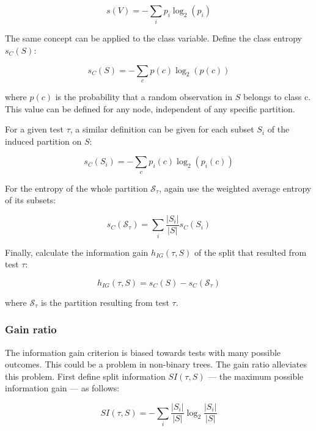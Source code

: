 \begin{equation}
    s(V) = - \sum_i p_i \log_2(p_i)
\end{equation}

The same concept can be applied to the class variable. Define the class entropy $s_C(S)$:

\begin{equation}
    s_C(S) = - \sum_c p(c) \log_2(p(c))
\end{equation}

where $p(c)$ is the probability that a random observation in $S$ belongs to class c. This value can be defined for any node, independent of any specific partition.

For a given test $\tau$, a similar definition can be given for each subset $S_i$ of the induced partition on $S$:

\begin{equation}
    s_C(S_i) = - \sum_c p_i(c) \log_2(p_i(c))
\end{equation}

For the entropy of the whole partition $\mathcal{S}_\tau$, again use the weighted average entropy of its subsets:

\begin{equation}
    s_C(\mathcal{S}_\tau) = \sum_i \frac{|S_i|}{|S|} s_C(S_i)
\end{equation}

Finally, calculate the information gain $h_{IG}(\tau, S)$ of the split that resulted from test $\tau$:

\begin{equation}
    h_{IG}(\tau, S) = s_C(S) - s_C(\mathcal{S}_\tau)
\end{equation}

where $\mathcal{S}_\tau$ is the partition resulting from test $\tau$.

\subsubsection{Gain ratio}
The information gain criterion is biased towards tests with many possible outcomes. This could be a problem in non-binary trees. The gain ratio alleviates this problem. First define split information $SI(\tau, S)$ --- the maximum possible information gain --- as follows:

\begin{equation}
    SI(\tau, S) = - \sum_i \frac{|S_i|}{|S|} \log_2 \frac{|S_i|}{|S|}
\end{equation}

